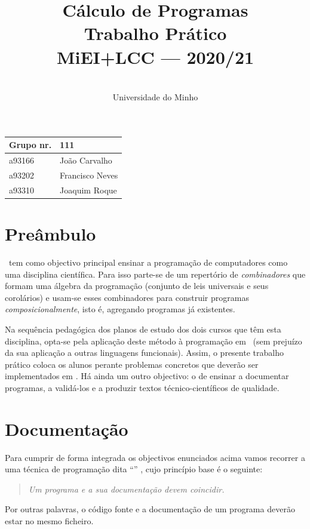 \documentclass[a4paper]{article}
\title{
       	Cálculo de Programas
\\
       	Trabalho Prático
\\
       	MiEI+LCC --- 2020/21
}
\author{
       	\dium
\\
       	Universidade do Minho
}
\date\mydate
\begin{document}
\maketitle

\begin{center}\large
\begin{tabular}{ll}
\textbf{Grupo} nr. & 111
\\\hline
a93166 & João Carvalho
\\
a93202 & Francisco Neves
\\
a93310 & Joaquim Roque
\end{tabular}
\end{center}

\section{Preâmbulo}

\CP\ tem como objectivo principal ensinar
a progra\-mação de computadores como uma disciplina científica. Para isso
parte-se de um repertório de \emph{combinadores} que formam uma álgebra da
programação (conjunto de leis universais e seus corolários) e usam-se esses
combinadores para construir programas \emph{composicionalmente}, isto é,
agregando programas já existentes.

Na sequência pedagógica dos planos de estudo dos dois cursos que têm
esta disciplina, opta-se pela aplicação deste método à programação
em \Haskell\ (sem prejuízo da sua aplicação a outras linguagens
funcionais). Assim, o presente trabalho prático coloca os
alunos perante problemas concretos que deverão ser implementados em
\Haskell.  Há ainda um outro objectivo: o de ensinar a documentar
programas, a validá-los e a produzir textos técnico-científicos de
qualidade.

\section{Documentação} Para cumprir de forma integrada os objectivos
enunciados acima vamos recorrer a uma técnica de programa\-ção dita
``'' \cite{Kn92}, cujo princípio base é o seguinte:
%
\begin{quote}\em Um programa e a sua documentação devem coincidir.
\end{quote}
%
Por outras palavras, o código fonte e a documentação de um
programa deverão estar no mesmo ficheiro.
\end{document}
